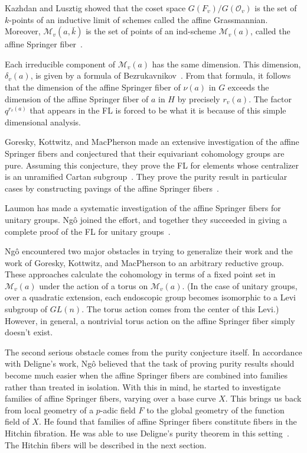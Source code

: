 \documentclass[brochure,english,12pt]{bourbaki}
\def\M{{\mathcal M}}
\def\O{{\mathcal O}}
\begin{document}
Kazhdan and Lusztig showed that the coset space $G(F_v)/G(\O_v)$ is the
set of $k$-points of an inductive limit of schemes called the affine
Grassmannian.  Moreover, $\M_v(a,\bar k)$ is the set of points of an ind-scheme $\M_v(a)$, called
the affine Springer fiber~\cite{KL:1988}.  

Each irreducible component of $\M_v(a)$ has the same dimension.  This
dimension, $\delta_v(a)$, is given by a formula of
Bezrukavnikov~\cite{Bezrukavnikov}.  From that formula, it follows
that the dimension of the affine Springer fiber of $\nu(a)$ in $G$
exceeds the dimension of the affine Springer fiber of $a$ in $H$ by
precisely $r_v(a)$.  The factor $q^{r_v(a)}$ that appears in the FL is
forced to be what it is because of this simple dimensional analysis.

Goresky, Kottwitz, and MacPherson made an extensive investigation of
the affine Springer fibers and conjectured that their equivariant
cohomology groups are pure.  Assuming this conjecture, they prove the
FL for elements whose centralizer is an unramified
Cartan subgroup~\cite{GKM:2004}.  They prove the purity result in particular cases by
constructing pavings of the affine Springer fibers~\cite{GKM:2006}.

Laumon has made a systematic investigation of
the affine Springer fibers for unitary groups.  Ng\^o joined the effort, and together they
succeeded in giving a complete proof of the FL for unitary groups~\cite{LN:08}.

Ng\^o encountered two major obstacles in trying to generalize their
work and the work of Goresky, Kottwitz, and MacPherson to an arbitrary
reductive group.  These approaches calculate the cohomology in terms
of a fixed point set in $\M_v(a)$ under the action of a torus on
$\M_v(a)$.  (In the case of unitary groups, over a quadratic
extension, each endoscopic group becomes isomorphic to a Levi subgroup
of $GL(n)$.  The torus action comes from the center of this Levi.)
However, in general, a nontrivial torus action on the affine Springer
fiber simply doesn't exist.

The second serious obstacle comes from the purity conjecture itself.
In accordance with Deligne's work, Ng\^o believed that the task of
proving purity results should become much easier when the affine
Springer fibers are combined into families rather than treated in
isolation.  With this in mind, he started to investigate families of
affine Springer fibers, varying over a base curve $X$.  This brings us
back from local geometry of a $p$-adic field $F$ to the global geometry of the function field of
$X$.  He found that families of affine Springer fibers 
constitute fibers in the Hitchin fibration.  He was able to use
Deligne's purity theorem in this setting~\cite{Deligne:Weil2}.  The
Hitchin fibers will be described in the next section.  
\end{document}
